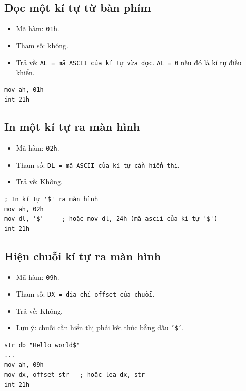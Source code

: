 \documentclass[12pt]{report}
\newcommand{\code}[1]{\texttt{#1}}
\begin{document}
\subsection{Đọc một kí tự từ bàn phím}
\begin{itemize}
    \item Mã hàm: \code{01h}.
    \item Tham số: không.
    \item Trả về: \code{AL = mã ASCII của kí tự vừa đọc}. \code{AL = 0} nếu đó là kí tự điều khiển.
\end{itemize}
\begin{verbatim}
mov ah, 01h 
int 21h
\end{verbatim}

\subsection{In một kí tự ra màn hình}
\begin{itemize}
    \item Mã hàm: \code{02h}.
    \item Tham số: \code{DL = mã ASCII của kí tự cần hiển thị}.
    \item Trả về: Không.
\end{itemize}
\begin{verbatim}
; In kí tự '$' ra màn hình 
mov ah, 02h 
mov dl, '$'     ; hoặc mov dl, 24h (mã ascii của kí tự '$')
int 21h
\end{verbatim}

\subsection{Hiện chuỗi kí tự ra màn hình}
\begin{itemize}
    \item Mã hàm: \code{09h}.
    \item Tham số: \code{DX = địa chỉ offset của chuỗi}.
    \item Trả về: Không.
    \item Lưu ý: chuỗi cần hiển thị phải kết thúc bằng dấu \code{'\$'}.
\end{itemize}
\begin{verbatim}
str db "Hello world$"
... 
mov ah, 09h 
mov dx, offset str   ; hoặc lea dx, str
int 21h
\end{verbatim}
\end{document}
